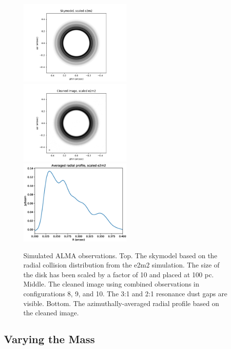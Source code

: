 \documentclass[twocolumn]{aastex63}
\begin{document}
\begin{figure}
\begin{center}
    \includegraphics[width=0.5\textwidth]{alma/skymodel_e2m2.png}
    \includegraphics[width=0.5\textwidth]{alma/xy_e2m2.png}
    \includegraphics[width=0.5\textwidth]{alma/profile_e2m2.eps}
    \caption{Simulated ALMA observations.  Top. The skymodel based on the radial collision distribution from the e2m2 simulation. The size of the disk has been scaled by a factor of 10 and placed at 100 pc. Middle. The cleaned image using combined observations in configurations 8, 9, and 10. The 3:1 and 2:1 resonance dust gaps are visible. Bottom. The azimuthally-averaged radial profile based on the cleaned image. \label{fig:alma_sim_obs}}
\end{center}
\end{figure}




\subsection{Varying the Mass}
\end{document}
